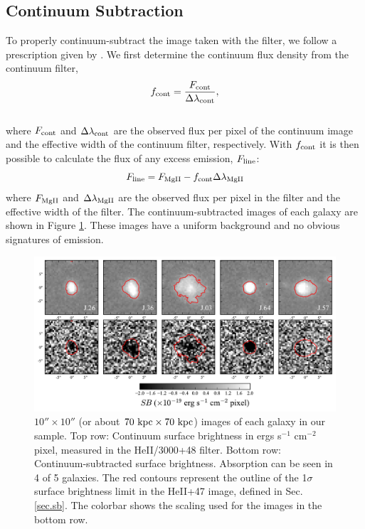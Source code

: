 \documentclass[twocolumn]{aastex62}
\begin{document}
\subsection{Continuum Subtraction}\label{subsec.cont_sub}

To properly continuum-subtract the image taken with the  filter, we follow a prescription given by \cite{Battaia_2015}. 
We first determine the continuum flux density from the continuum filter,
\begin{equation}
f_{\rm{cont}}=\frac{F_{\rm{cont}}}{\Delta \lambda_{\rm{cont}}},
\end{equation}\\
where $F_{\rm{cont}}$ and $\Delta \lambda_{\rm{cont}}$ are the observed flux per pixel of the continuum image and the effective width of the continuum filter, respectively. With $f_{\rm cont}$ it is then possible to calculate the flux of any excess emission, $F_{\rm{line}}$:
\begin{equation}
F_{\rm{line}}=F_{\rm{MgII}}-f_{\rm{cont}} \Delta \lambda_{\rm{MgII}}
\label{eq:subtraction}
\end{equation}
where $F_{\rm{MgII}}$ and $\Delta \lambda_{\rm MgII}$ are the observed flux per pixel in the  filter and the effective width of the  filter. The continuum-subtracted images of each galaxy are shown in Figure \ref{fig:stamp_images}. %
These
images have a uniform background and no obvious signatures of emission.

\begin{figure}[!htb]
\centering
\includegraphics[scale=0.7]{figure5.pdf}%
\caption{ $10'' \times 10''$ (or about $70 \rm \ kpc \times 70 \rm \ kpc $) images of each galaxy in our sample. Top row: Continuum surface brightness in ergs s$^{-1}$ cm$^{-2}$ pixel, measured in the HeII/3000+48 filter. Bottom row: Continuum-subtracted  surface brightness.  Absorption can be seen in 4 of 5 galaxies. The red contours represent the outline of the 1$\sigma$ surface brightness limit in the HeII+47 image, defined in Sec. \ref{sec.sb}. The colorbar shows the scaling used for the  images in the bottom row.}
\label{fig:stamp_images}
\end{figure}
\end{document}
